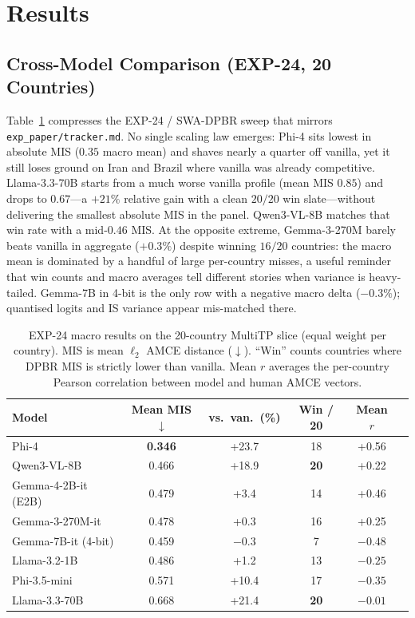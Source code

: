 \documentclass{article}
\newcommand{\gain}[1]{\textcolor{improvegreen}{#1}}
\newcommand{\loss}[1]{\textcolor{worsered}{#1}}
\begin{document}
\section{Results}
\label{sec:results}

\subsection{Cross-Model Comparison (EXP-24, 20 Countries)}

Table~\ref{tab:exp24_summary} compresses the EXP-24 / SWA-DPBR sweep that mirrors
\texttt{exp\_paper/tracker.md}. No single scaling law emerges: Phi-4 sits lowest in
absolute MIS ($0.35$ macro mean) and shaves nearly a quarter off vanilla, yet it
still loses ground on Iran and Brazil where vanilla was already competitive.
Llama-3.3-70B starts from a much worse vanilla profile (mean MIS $0.85$) and drops
to $0.67$---a $+21\%$ relative gain with a clean $20/20$ win slate---without
delivering the smallest absolute MIS in the panel. Qwen3-VL-8B matches that win
rate with a mid-$0.46$ MIS. At the opposite extreme, Gemma-3-270M barely beats
vanilla in aggregate ($+0.3\%$) despite winning $16/20$ countries: the macro mean is
dominated by a handful of large per-country misses, a useful reminder that win
counts and macro averages tell different stories when variance is heavy-tailed.
Gemma-7B in 4-bit is the only row with a negative macro delta ($-0.3\%$); quantised
logits and IS variance appear mis-matched there.

\begin{table}[t]
\caption{EXP-24 macro results on the 20-country MultiTP slice (equal weight per
country). MIS is mean $\ell_2$ AMCE distance ($\downarrow$). ``Win'' counts
countries where DPBR MIS is strictly lower than vanilla. Mean $r$ averages the
per-country Pearson correlation between model and human AMCE vectors.}
\label{tab:exp24_summary}
\centering\small
\setlength{\tabcolsep}{4pt}
\begin{tabular}{lccccc}
\toprule
Model & Mean MIS $\downarrow$ & vs.\ van.\ (\%) & Win / 20 & Mean $r$ \\
\midrule
Phi-4                 & \textbf{0.346} & \gain{+23.7} & 18 & +0.56 \\
Qwen3-VL-8B           & 0.466 & \gain{+18.9} & \textbf{20} & +0.22 \\
Gemma-4-2B-it (E2B)   & 0.479 & \gain{+3.4}  & 14 & +0.46 \\
Gemma-3-270M-it       & 0.478 & \gain{+0.3}  & 16 & +0.25 \\
Gemma-7B-it (4-bit)   & 0.459 & \loss{$-$0.3} & 7  & $-0.48$ \\
Llama-3.2-1B          & 0.486 & \gain{+1.2}  & 13 & $-0.25$ \\
Phi-3.5-mini          & 0.571 & \gain{+10.4} & 17 & $-0.35$ \\
Llama-3.3-70B         & 0.668 & \gain{+21.4} & \textbf{20} & $-0.01$ \\
\bottomrule
\end{tabular}
\end{table}
\end{document}
